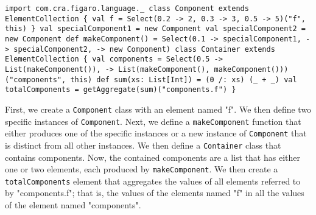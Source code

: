 \begin{flushleft}
\texttt{import com.cra.figaro.language.\_
\newline 
\newline class Component extends ElementCollection \{
\newline \tab val f = Select(0.2 -> 2, 0.3 -> 3, 0.5 -> 5)("f", this)
\newline \}
\newline 
\newline val specialComponent1 = new Component 
\newline val specialComponent2 = new Component
\newline 
\newline def makeComponent() =
\newline \tab Select(0.1 -> specialComponent1,
\newline {} -> specialComponent2,
\newline {} -> new Component)
\newline 
\newline class Container extends ElementCollection \{
\newline \tab val components =
\newline \tab Select(0.5 -> List(makeComponent()),
\newline {} -> List(makeComponent(), makeComponent())) 
\newline \tab ("components", this)
\newline 
{}
\newline def sum(xs: List[Int]) = (0 /: xs) (\_ + \_)
\newline 
\newline \tab val totalComponents =
\newline \tab getAggregate(sum)("components.f")
\newline \}
}
\end{flushleft}

First, we create a \texttt{Component} class with an element named "f". We then define two specific instances of \texttt{Component}. Next, we define a \texttt{makeComponent} function that either produces one of the specific instances or a new instance of \texttt{Component} that is distinct from all other instances. We then define a \texttt{Container} class that contains components. Now, the contained components are a list that has either one or two elements, each produced by \texttt{makeComponent}. We then create a \texttt{totalComponents} element that aggregates the values of all elements referred to by "components.f"; that is, the values of the elements named "f" in all the values of the element named "components".

